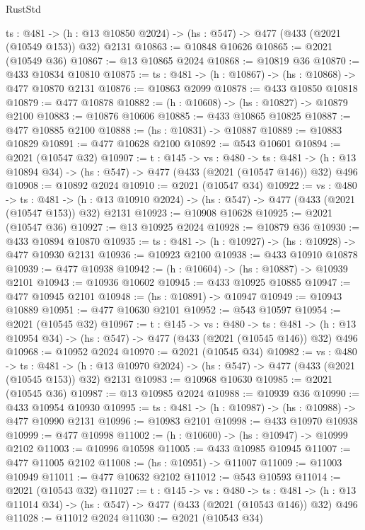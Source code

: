 \begin{lexlean}{RustStd}
\begin{coremodule}
  {ts : @481} ->
  (h : @13 @10850 @2024) -> (hs : @547) -> @477 (@433 (@2021 (@10549 @153)) @32) @2131
@10863 := @10848 @10626
@10865 := @2021 (@10549 @36)
@10867 := @13 @10865 @2024
@10868 := @10819 @36
@10870 := @433 @10834 @10810
@10875 := {ts : @481} -> (h : @10867) -> (hs : @10868) -> @477 @10870 @2131
@10876 := @10863 @2099
@10878 := @433 @10850 @10818
@10879 := @477 @10878
@10882 := (h : @10608) -> (hs : @10827) -> @10879 @2100
@10883 := @10876 @10606
@10885 := @433 @10865 @10825
@10887 := @477 @10885 @2100
@10888 := (hs : @10831) -> @10887
@10889 := @10883 @10829
@10891 := @477 @10628 @2100
@10892 := @543 @10601
@10894 := @2021 (@10547 @32)
@10907 := {t : @145} ->
  {vs : @480} ->
  {ts : @481} -> (h : @13 @10894 @34) -> (hs : @547) -> @477 (@433 (@2021 (@10547 @146)) @32) @496
@10908 := @10892 @2024
@10910 := @2021 (@10547 @34)
@10922 := {vs : @480} ->
  {ts : @481} ->
  (h : @13 @10910 @2024) -> (hs : @547) -> @477 (@433 (@2021 (@10547 @153)) @32) @2131
@10923 := @10908 @10628
@10925 := @2021 (@10547 @36)
@10927 := @13 @10925 @2024
@10928 := @10879 @36
@10930 := @433 @10894 @10870
@10935 := {ts : @481} -> (h : @10927) -> (hs : @10928) -> @477 @10930 @2131
@10936 := @10923 @2100
@10938 := @433 @10910 @10878
@10939 := @477 @10938
@10942 := (h : @10604) -> (hs : @10887) -> @10939 @2101
@10943 := @10936 @10602
@10945 := @433 @10925 @10885
@10947 := @477 @10945 @2101
@10948 := (hs : @10891) -> @10947
@10949 := @10943 @10889
@10951 := @477 @10630 @2101
@10952 := @543 @10597
@10954 := @2021 (@10545 @32)
@10967 := {t : @145} ->
  {vs : @480} ->
  {ts : @481} -> (h : @13 @10954 @34) -> (hs : @547) -> @477 (@433 (@2021 (@10545 @146)) @32) @496
@10968 := @10952 @2024
@10970 := @2021 (@10545 @34)
@10982 := {vs : @480} ->
  {ts : @481} ->
  (h : @13 @10970 @2024) -> (hs : @547) -> @477 (@433 (@2021 (@10545 @153)) @32) @2131
@10983 := @10968 @10630
@10985 := @2021 (@10545 @36)
@10987 := @13 @10985 @2024
@10988 := @10939 @36
@10990 := @433 @10954 @10930
@10995 := {ts : @481} -> (h : @10987) -> (hs : @10988) -> @477 @10990 @2131
@10996 := @10983 @2101
@10998 := @433 @10970 @10938
@10999 := @477 @10998
@11002 := (h : @10600) -> (hs : @10947) -> @10999 @2102
@11003 := @10996 @10598
@11005 := @433 @10985 @10945
@11007 := @477 @11005 @2102
@11008 := (hs : @10951) -> @11007
@11009 := @11003 @10949
@11011 := @477 @10632 @2102
@11012 := @543 @10593
@11014 := @2021 (@10543 @32)
@11027 := {t : @145} ->
  {vs : @480} ->
  {ts : @481} -> (h : @13 @11014 @34) -> (hs : @547) -> @477 (@433 (@2021 (@10543 @146)) @32) @496
@11028 := @11012 @2024
@11030 := @2021 (@10543 @34)

\end{coremodule}
\end{lexlean}
